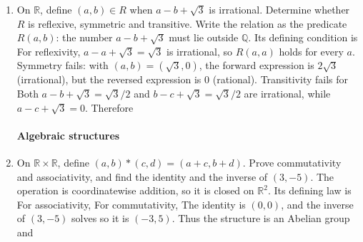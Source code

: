 \begin{enumerate}[label=\thesection.\arabic{subsection}.\arabic{enumi},ref=\arabic{enumi},leftmargin=4mm,itemsep=9pt]
\item \label{question:C12-Q49}\label{question-short:C12-Q49} On $\mathbb R$, define $(a,b)\in R$ when $a-b+\sqrt3$ is irrational. Determine whether $R$ is reflexive, symmetric and transitive.
\engsolution
Write the relation as the predicate $R(a,b)$: the number $a-b+\sqrt3$ must lie outside $\mathbb Q$. Its defining condition is
For reflexivity, $a-a+\sqrt3=\sqrt3$ is irrational, so $R(a,a)$ holds for every $a$. Symmetry fails: with $(a,b)=(\sqrt3,0)$, the forward expression is $2\sqrt3$ (irrational), but the reversed expression is $0$ (rational). Transitivity fails for
Both $a-b+\sqrt3=\sqrt3/2$ and $b-c+\sqrt3=\sqrt3/2$ are irrational, while $a-c+\sqrt3=0$. Therefore

\paragraph*{Algebraic structures}
\item \label{question:C12-Q50}\label{question-short:C12-Q50} On $\mathbb R\times\mathbb R$, define $(a,b)*(c,d)=(a+c,b+d)$. Prove commutativity and associativity, and find the identity and the inverse of $(3,-5)$.
\engsolution
The operation is coordinatewise addition, so it is closed on $\mathbb R^2$. Its defining law is
For associativity,
For commutativity,
The identity is $(0,0)$, and the inverse of $(3,-5)$ solves
so it is $(-3,5)$. Thus the structure is an Abelian group and


\end{enumerate}
